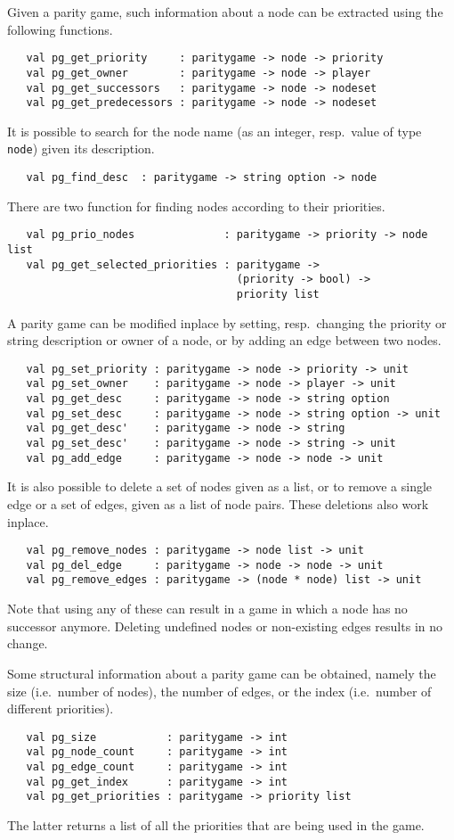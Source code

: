 Given a parity game, such information about a node can be extracted using the following functions.
\begin{verbatim}
   val pg_get_priority     : paritygame -> node -> priority
   val pg_get_owner        : paritygame -> node -> player
   val pg_get_successors   : paritygame -> node -> nodeset
   val pg_get_predecessors : paritygame -> node -> nodeset
\end{verbatim}
It is possible to search for the node name (as an integer, resp.\ value of type \verb#node#) given its description.
\begin{verbatim}
   val pg_find_desc  : paritygame -> string option -> node
\end{verbatim}
There are two function for finding nodes according to their priorities.
\begin{verbatim}
   val pg_prio_nodes              : paritygame -> priority -> node list
   val pg_get_selected_priorities : paritygame -> 
                                    (priority -> bool) -> 
                                    priority list
\end{verbatim}
A parity game can be modified inplace by setting, resp.\ changing the priority or string description or owner of a node, or by adding an 
edge between two nodes.
\begin{verbatim}
   val pg_set_priority : paritygame -> node -> priority -> unit
   val pg_set_owner    : paritygame -> node -> player -> unit
   val pg_get_desc     : paritygame -> node -> string option
   val pg_set_desc     : paritygame -> node -> string option -> unit
   val pg_get_desc'    : paritygame -> node -> string
   val pg_set_desc'    : paritygame -> node -> string -> unit
   val pg_add_edge     : paritygame -> node -> node -> unit
\end{verbatim}
It is also possible to delete a set of nodes given as a list, or to remove a single edge or a set of edges, given as a list of node pairs. These
deletions also work inplace.
\begin{verbatim}
   val pg_remove_nodes : paritygame -> node list -> unit
   val pg_del_edge     : paritygame -> node -> node -> unit
   val pg_remove_edges : paritygame -> (node * node) list -> unit
\end{verbatim}
Note that using any of these can result in a game in which a node has no successor anymore. Deleting undefined nodes or non-existing edges results
in no change.

Some structural information about a parity game can be obtained, namely the size (i.e.\ number of nodes), the number of edges, or the index (i.e.\ number
of different priorities). 
\begin{verbatim}
   val pg_size	         : paritygame -> int
   val pg_node_count     : paritygame -> int
   val pg_edge_count     : paritygame -> int
   val pg_get_index      : paritygame -> int
   val pg_get_priorities : paritygame -> priority list
\end{verbatim}
The latter returns a list of all the priorities that are being used in the game.

